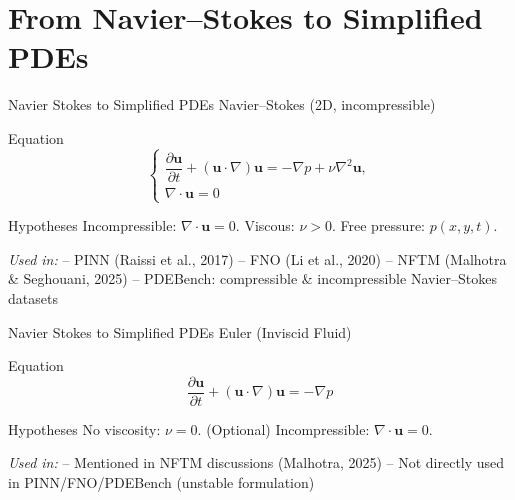 \section{From Navier--Stokes to Simplified PDEs}

\begin{frame}{Navier Stokes to Simplified PDEs}
\small
\textcolor{red_unipd}{\Large Navier--Stokes (2D, incompressible)}

\vspace{0.6em}

\begin{alertblock}{Equation}
\[
\begin{cases}
\dfrac{\partial \mathbf{u}}{\partial t} 
+ (\mathbf{u}\!\cdot\!\nabla)\mathbf{u}
= -\nabla p + \nu\nabla^2 \mathbf{u},\\[4pt]
\nabla\!\cdot\!\mathbf{u} = 0
\end{cases}
\]
\end{alertblock}

\vfill

\begin{block}{Hypotheses}
Incompressible: \(\nabla\!\cdot\!\mathbf{u} = 0\). \quad
Viscous: \(\nu>0\). \quad
Free pressure: \(p(x,y,t)\).
\end{block}

\vspace{0.5em}
\textit{Used in:}  
– PINN (Raissi et al., 2017)  
– FNO (Li et al., 2020)  
– NFTM (Malhotra \& Seghouani, 2025)  
– PDEBench: compressible \& incompressible Navier–Stokes datasets
\end{frame}


\begin{frame}{Navier Stokes to Simplified PDEs}
\small
\textcolor{red_unipd}{\Large Euler (Inviscid Fluid)}

\vspace{0.6em}

\begin{alertblock}{Equation}
\[
\dfrac{\partial \mathbf{u}}{\partial t} 
+ (\mathbf{u}\!\cdot\!\nabla)\mathbf{u}
= -\nabla p
\]
\end{alertblock}

\vfill

\begin{block}{Hypotheses}
No viscosity: \(\nu = 0\). \quad
(Optional) Incompressible: \(\nabla\!\cdot\!\mathbf{u}=0\).
\end{block}

\vspace{0.5em}
\textit{Used in:}  
– Mentioned in NFTM discussions (Malhotra, 2025)  
– Not directly used in PINN/FNO/PDEBench (unstable formulation)
\end{frame}


